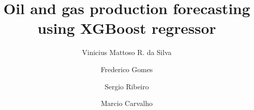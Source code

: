 \documentclass[preprint,12pt,authoryear]{elsarticle}
\begin{document}
\begin{frontmatter}



\title{Oil and gas production forecasting using XGBoost regressor}

\author[inst1]{Vinicius Mattoso R. da Silva}


\author[inst1]{Frederico Gomes}
\author[inst1]{Sergio Ribeiro}
\author[inst1]{Marcio Carvalho}

\begin{abstract}


\end{abstract}
\end{frontmatter}
\end{document}
